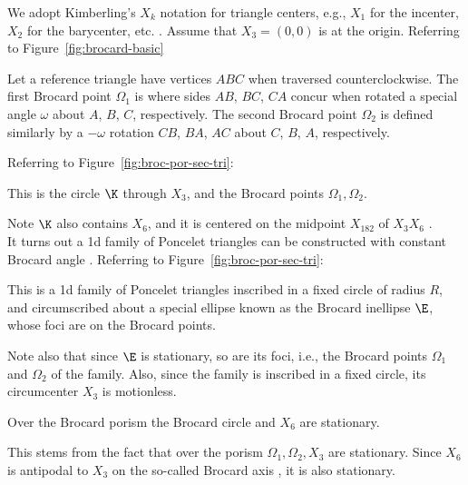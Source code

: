 We adopt Kimberling's $X_k$ notation for triangle centers, e.g., $X_1$ for the incenter, $X_2$ for the barycenter, etc. \cite{etc}. Assume that $X_3=(0,0)$ is at the origin. Referring to Figure~\ref{fig:brocard-basic}

\begin{definition}
Let a reference triangle have vertices $ABC$ when traversed counterclockwise. The first Brocard point $\Omega_1$ is where sides $AB$, $BC$, $CA$ concur when rotated a special angle $\omega$ about $A$, $B$, $C$, respectively. The second Brocard point $\Omega_2$ is defined similarly by a $-\omega$ rotation $CB$, $BA$, $AC$ about $C$, $B$, $A$, respectively.
\end{definition}

\noindent Referring to Figure~\ref{fig:broc-por-sec-tri}:

\begin{definition}
This is the circle $\K$ through $X_3$, and the Brocard points $\Omega_1, \Omega_2$.
\end{definition}

\noindent Note $\K$ also contains $X_6$, and it is centered on the midpoint $X_{182}$ of $X_3 X_6$ \cite{mw}.\\

\noindent It turns out a 1d family of Poncelet triangles can be constructed with constant Brocard angle \cite{bradley2007-brocard}. Referring to Figure~\ref{fig:broc-por-sec-tri}:

\begin{definition}
This is a 1d family of Poncelet triangles inscribed in a fixed circle of radius $R$, and circumscribed about a special ellipse known as the Brocard inellipse $\E$, whose foci are on the Brocard points.
\end{definition}

\noindent Note also that since $\E$ is stationary, so are its foci, i.e., the Brocard points $\Omega_1$ and $\Omega_2$ of the family. Also, since the family is inscribed in a fixed circle, its circumcenter $X_3$ is motionless.


\begin{corollary}
Over the Brocard porism the Brocard circle and $X_6$ are stationary.
\end{corollary}

\noindent This stems from the fact that over the porism $\Omega_1,\Omega_2,X_3$ are stationary. Since $X_6$ is antipodal to $X_3$ on the so-called Brocard axis \cite{mw}, it is also stationary.

